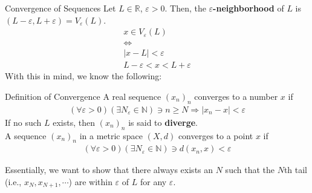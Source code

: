 \documentclass[8pt]{extarticle}
\newcommand{\N}{\mathbb{N}}
\newcommand{\R}{\mathbb{R}}
\begin{document}
  \begin{problem}{Convergence of Sequences}
    Let $L\in\R$, $\varepsilon > 0$. Then, the $\varepsilon$\textbf{-neighborhood} of $L$ is $(L-\varepsilon, L+\varepsilon) = V_{\varepsilon}(L)$.
    \begin{align*}
      x\in V_{\varepsilon}(L)\\
      \Leftrightarrow\\
      |x-L| < \varepsilon\\
      L-\varepsilon < x < L+\varepsilon
    \end{align*}
    With this in mind, we know the following:
    \begin{problem}{Definition of Convergence}
      A real sequence $(x_n)_n$ converges to a number $x$ if 
      \begin{align*}
        \left(\forall \varepsilon > 0\right)\left(\exists N_{\varepsilon}\in\N\right) \ni n\geq N \Rightarrow |x_n-x| < \varepsilon
      \end{align*}
      If no such $L$ exists, then $(x_n)_n$ is said to \textbf{diverge}.\\

      A sequence $(x_n)_n$ in a metric space $(X,d)$ converges to a point $x$ if
      \begin{align*}
        \left(\forall \varepsilon > 0\right)\left(\exists N_{\varepsilon}\in\N\right) \ni d(x_n,x) < \varepsilon
      \end{align*}
    \end{problem}
    Essentially, we want to show that there always exists an $N$ such that the $N$th tail (i.e., $x_{N}, x_{N+1},\cdots$) are within $\varepsilon$ of $L$ for any $\varepsilon$.\\


\end{problem}
\end{document}
